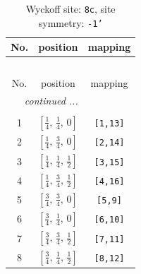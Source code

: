 \documentclass[fleqn,8pt]{jsarticle}
\begin{document}
\renewcommand{\arraystretch}{1.2}
\begin{longtable}{ccc}
\caption{Wyckoff site: {\tt 8c}, site symmetry: {\tt -1'}}
 \\
 \hline \hline
No. & position & mapping \\ \hline \endfirsthead

\multicolumn{2}{l}{\tablename\ \thetable{}} \\
 \hline \hline
No. & position & mapping \\ \hline \endhead

 \hline \hline
\multicolumn{2}{r}{\footnotesize\it continued ...} \\ \endfoot

 \hline \hline
\multicolumn{2}{r}{} \\ \endlastfoot

1 & $\left[ \frac{1}{4},\, \frac{1}{4},\, 0 \right]$ & {\tt [1,13]} \\ \hline
2 & $\left[ \frac{1}{4},\, \frac{3}{4},\, 0 \right]$ & {\tt [2,14]} \\ \hline
3 & $\left[ \frac{1}{4},\, \frac{1}{4},\, \frac{1}{2} \right]$ & {\tt [3,15]} \\ \hline
4 & $\left[ \frac{1}{4},\, \frac{3}{4},\, \frac{1}{2} \right]$ & {\tt [4,16]} \\ \hline
5 & $\left[ \frac{3}{4},\, \frac{3}{4},\, 0 \right]$ & {\tt [5,9]} \\ \hline
6 & $\left[ \frac{3}{4},\, \frac{1}{4},\, 0 \right]$ & {\tt [6,10]} \\ \hline
7 & $\left[ \frac{3}{4},\, \frac{3}{4},\, \frac{1}{2} \right]$ & {\tt [7,11]} \\ \hline
8 & $\left[ \frac{3}{4},\, \frac{1}{4},\, \frac{1}{2} \right]$ & {\tt [8,12]} \\
\end{longtable}
\renewcommand{\arraystretch}{1.2}
\end{document}
